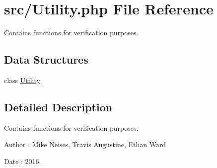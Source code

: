 \hypertarget{_utility_8php}{}\section{src/\+Utility.php File Reference}
\label{_utility_8php}


Contains functions for verification purposes.  


\subsection*{Data Structures}
\begin{DoxyCompactItemize}
\item 
class \hyperlink{class_utility}{Utility}
\end{DoxyCompactItemize}


\subsection{Detailed Description}
Contains functions for verification purposes. 

\begin{DoxyAuthor}{Author}
\+: Mike Neises, Travis Augustine, Ethan Ward 
\end{DoxyAuthor}
\begin{DoxyDate}{Date}
\+: 2016.. 
\end{DoxyDate}
